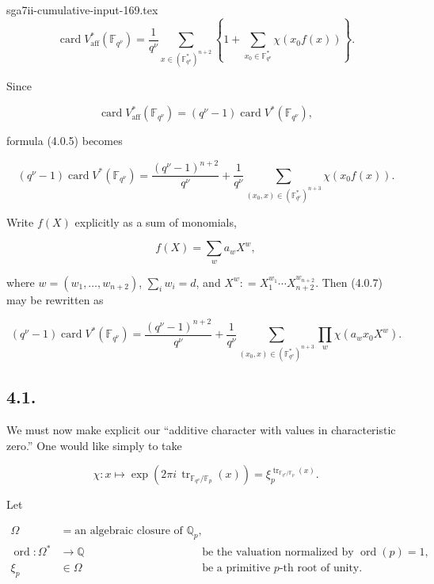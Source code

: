 \begin{filecontents*}{sga7ii-cumulative-input-169.tex}
\begin{equation}\tag{4.0.5}
\operatorname{card}V^*_{\mathrm{aff}}(\mathbb F_{q^\nu})
=\frac1{q^\nu}
\sum_{x\in(\mathbb F_{q^\nu}^*)^{n+2}}
\left\{1+\sum_{x_0\in\mathbb F_{q^\nu}^*}\chi(x_0f(x))\right\}.
\end{equation}

Since

\begin{equation}\tag{4.0.6}
\operatorname{card}V^*_{\mathrm{aff}}(\mathbb F_{q^\nu})
=(q^\nu-1)\operatorname{card}V^*(\mathbb F_{q^\nu}),
\end{equation}

formula (4.0.5) becomes

\begin{equation}\tag{4.0.7}
(q^\nu-1)\operatorname{card}V^*(\mathbb F_{q^\nu})
=\frac{(q^\nu-1)^{n+2}}{q^\nu}
+\frac1{q^\nu}
\sum_{(x_0,x)\in(\mathbb F_{q^\nu}^*)^{n+3}}\chi(x_0f(x)).
\end{equation}

Write $f(X)$ explicitly as a sum of monomials,

\begin{equation}\tag{4.0.8}
f(X)=\sum_w a_wX^w,
\end{equation}

where $w=(w_1,\ldots,w_{n+2})$, $\sum_iw_i=d$, and
$X^w\mathrel{\mathop:}=X_1^{w_1}\cdots X_{n+2}^{w_{n+2}}$. Then (4.0.7)
may be rewritten as

\begin{equation}\tag{4.0.9}
(q^\nu-1)\operatorname{card}V^*(\mathbb F_{q^\nu})
=\frac{(q^\nu-1)^{n+2}}{q^\nu}
+\frac1{q^\nu}
\sum_{(x_0,x)\in(\mathbb F_{q^\nu}^*)^{n+3}}
\prod_w\chi(a_wx_0X^w).
\end{equation}

\subsection*{4.1.}
We must now make explicit our ``additive character with values in
characteristic zero.'' One would like simply to take

\begin{equation}\tag{4.1.0}
\chi:x\longmapsto
\exp\!\left(2\pi i\,\operatorname{tr}_{\mathbb F_{q^\nu}/\mathbb F_p}(x)\right)
=\xi_p^{\operatorname{tr}_{\mathbb F_{q^\nu}/\mathbb F_p}(x)}.
\end{equation}

Let

\begin{align}
\tag{4.1.1}
\Omega&=\text{an algebraic closure of }\mathbb Q_p,\\
\tag{4.1.2}
\operatorname{ord}:\Omega^*&\longrightarrow\mathbb Q
  &&\text{be the valuation normalized by }\operatorname{ord}(p)=1,\\
\tag{4.1.3}
\xi_p&\in\Omega
  &&\text{be a primitive $p$-th root of unity.}
\end{align}


\end{filecontents*}

